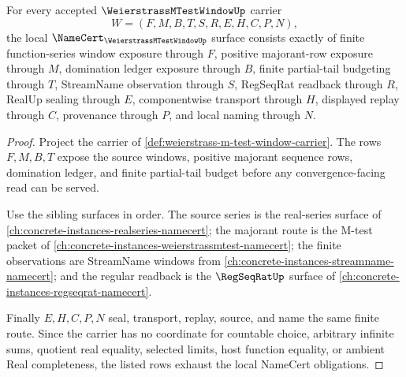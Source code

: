 \begin{theorem}
\label{thm:weierstrass-m-test-window-namecert-obligations}
For every accepted $\WeierstrassMTestWindowUp$ carrier
$$
W=(F,M,B,T,S,R,E,H,C,P,N),
$$
the local $\NameCert_{\WeierstrassMTestWindowUp}$ surface consists exactly of finite function-series window exposure through $F$, positive majorant-row exposure through $M$, domination ledger exposure through $B$, finite partial-tail budgeting through $T$, StreamName observation through $S$, RegSeqRat readback through $R$, RealUp sealing through $E$, componentwise transport through $H$, displayed replay through $C$, provenance through $P$, and local naming through $N$.
\end{theorem}
\begin{proof}
Project the carrier of \autoref{def:weierstrass-m-test-window-carrier}. The rows $F,M,B,T$ expose the source windows, positive majorant sequence rows, domination ledger, and finite partial-tail budget before any convergence-facing read can be served.

Use the sibling surfaces in order. The source series is the real-series surface of \autoref{ch:concrete-instances-realseries-namecert}; the majorant route is the M-test packet of \autoref{ch:concrete-instances-weierstrassmtest-namecert}; the finite observations are StreamName windows from \autoref{ch:concrete-instances-streamname-namecert}; and the regular readback is the $\RegSeqRatUp$ surface of \autoref{ch:concrete-instances-regseqrat-namecert}.

Finally $E,H,C,P,N$ seal, transport, replay, source, and name the same finite route. Since the carrier has no coordinate for countable choice, arbitrary infinite sums, quotient real equality, selected limits, host function equality, or ambient Real completeness, the listed rows exhaust the local NameCert obligations.
\end{proof}

